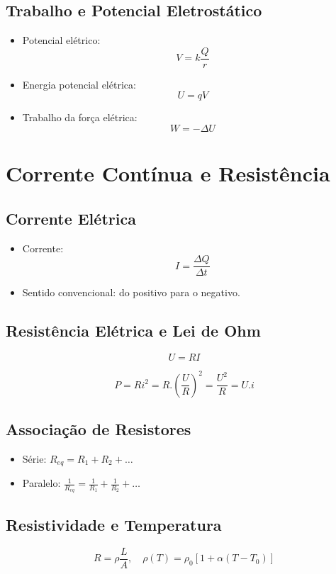 \documentclass[a4paper,12pt]{article}
\begin{document}
\begin{multicols}{2}
\subsection{Trabalho e Potencial Eletrostático}
\begin{itemize}
    \item Potencial elétrico: 
    \[
        V = k \frac{Q}{r}
    \]
    \item Energia potencial elétrica: 
    \[
        U = qV
    \]
    \item Trabalho da força elétrica:
    \[
        W = -\Delta U
    \]
\end{itemize}

\section{Corrente Contínua e Resistência}

\subsection{Corrente Elétrica}
\begin{itemize}
    \item Corrente: 
    \[
        I = \frac{\Delta Q}{\Delta t}
    \]
    \item Sentido convencional: do positivo para o negativo.
\end{itemize}

\subsection{Resistência Elétrica e Lei de Ohm}
\[
    U = R I
\]

\[ 
P = Ri^{2} = R.\left(\frac{U}{R}\right)^{2} = \frac{U^{2}}{R} = U.i
\]


\subsection{Associação de Resistores}
\begin{itemize}
    \item Série: $R_{eq} = R_1 + R_2 + \dots$
    \item Paralelo: $\frac{1}{R_{eq}} = \frac{1}{R_1} + \frac{1}{R_2} + \dots$
\end{itemize}

\subsection{Resistividade e Temperatura}
\[
    R = \rho \frac{L}{A}, \quad \rho(T) = \rho_0[1 + \alpha(T - T_0)]
\]


\end{multicols}
\end{document}
